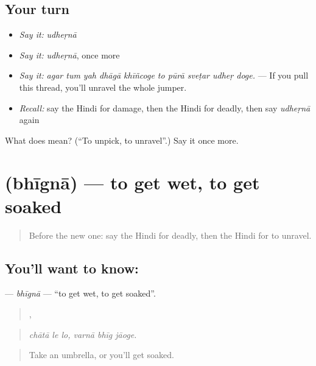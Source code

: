 \subsection*{Your turn}
\begin{itemize}
\raggedright
  \item \emph{Say it:} \emph{udheṛnā}
  \item \emph{Say it:} \emph{udheṛnā}, once more
  \item \emph{Say it:} \emph{agar tum yah dhāgā khīñcoge to pūrā sveṭar udheṛ doge.} — If you pull this thread, you'll unravel the whole jumper.
  \item \emph{Recall:} say the Hindi for damage, then the Hindi for deadly, then say \emph{udheṛnā} again
\end{itemize}

\begin{tcolorbox}[breakable,colback=teal!4,colframe=teal!35!black,title={Before you move on}]
What does  mean? (\textquotedblleft{}To unpick, to unravel\textquotedblright{}.) Say it once more.
\end{tcolorbox}
\section[\texorpdfstring{\hi{भीगना} (bhīgnā)}{भीगना (bhīgnā)}]{ (bhīgnā) — to get wet, to get soaked}

\label{lesson:HI-C383-bhigna}



\begin{quote}
Before the new one: say the Hindi for deadly, then the Hindi for to unravel.
\end{quote}

\subsection*{You'll want to know: }
\textbf{} — \emph{bhīgnā} — \textquotedblleft{}to get wet, to get soaked\textquotedblright{}.

\begin{quote}
  ,   
\end{quote}

\begin{quote}
\emph{chātā le lo, varnā bhīg jāoge.}
\end{quote}

\begin{quote}
Take an umbrella, or you'll get soaked.
\end{quote}

